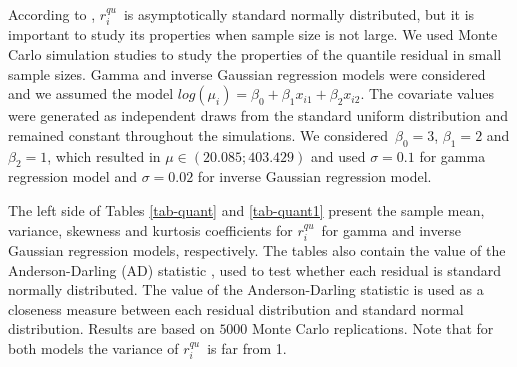 \documentclass[11pt,authoryear,review,3p,times]{elsarticle}
\newcommand{\qu}{$r_i^{qu}$}
\begin{document}
 
 According to \cite{dunn}, \qu\, is asymptotically standard normally distributed, but it is important to study its properties when sample size is not large.
We used Monte Carlo simulation studies to study the properties of the quantile residual in small sample sizes. 
Gamma and inverse Gaussian regression models were considered and we assumed the model $log(\mu_i)=\beta_0+\beta_{1}x_{i1}+\beta_{2}x_{i2}$.  The covariate values were generated as independent draws from the standard uniform distribution and remained constant throughout the simulations.
We considered \,$\beta_{0}=3$, $\beta_1=2$ and $\beta_2=1$,  which resulted in $\mu \in (20{.}085 ; 403{.}429)$ and used $\sigma=0{.}1$ for gamma regression model and $\sigma=0{.}02$ for inverse Gaussian regression model.

The left side of Tables \ref{tab-quant} and \ref{tab-quant1} present the sample mean, variance, skewness and kurtosis coefficients for \qu\ for gamma and inverse Gaussian regression models, respectively. 
The tables also contain the value of the Anderson-Darling (AD) statistic \citep{anderson}, used to test whether each residual is standard normally distributed.
The value of the Anderson-Darling statistic is used as a closeness measure between each residual distribution and standard normal distribution. Results are based on $5000$ Monte Carlo replications. Note that for both models the variance of \qu\, is far from 1.
\end{document}
